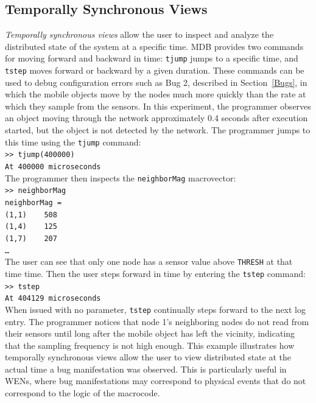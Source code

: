 \subsection{Temporally Synchronous Views} \label{temporal}

\emph{Temporally synchronous views} allow the user to inspect and analyze the
distributed state of the system at a specific time.  MDB provides two commands
for moving forward and backward in time: {\tt tjump} jumps to a specific time,
and {\tt tstep} moves forward or backward by a given duration. These commands
can be used to debug configuration errors such as Bug 2, described in
Section~\ref{Bugs}, in which the mobile objects move by the nodes much more
quickly than the rate at which they sample from the sensors.  In this
experiment, the programmer observes an object moving through the network
approximately 0.4 seconds after execution started, but the object is not
detected by the network.  The
programmer jumps to this time using the {\tt tjump} command:\\
{\small\indent\tt >> tjump(400000)}\\
{\small\indent\tt At 400000 microseconds}\\
The programmer then
inspects the {\tt neighborMag} macrovector:\\
{\small\indent\tt >> neighborMag}\\
{\tt\small\indent neighborMag =}\\
{\small\tt\indent\indent(1,1)~~~~508}\\
{\small\tt\indent\indent(1,4)~~~~125}\\
{\small\tt\indent\indent(1,7)~~~~207}\\
{\small\tt\indent\indent\ldots}\\
The user can see that only one node has a sensor value above {\tt THRESH} at
that time time. Then the user steps forward in time by entering the {\tt tstep}
command:\\
{\small\indent\tt >> tstep}\\
{\small\indent\tt At 404129 microseconds}\\
When issued with no parameter, {\tt tstep} continually steps forward to the next
log entry.  The programmer notices that node 1's neighboring nodes do not read
from their sensors until long after the mobile object has left the vicinity,
indicating that the sampling frequency is not high enough.  This example
illustrates how temporally synchronous views allow the user to view distributed
state at the actual time a bug manifestation was observed.  This is particularly
useful in WENs, where bug manifestations may correspond to physical events that
do not correspond to the logic of the macrocode.
 

